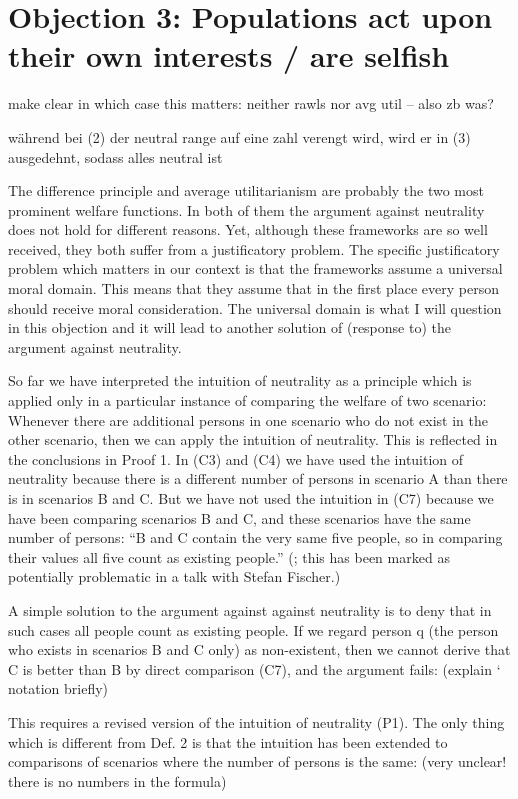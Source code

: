 \section{Objection 3: Populations act upon their own interests / are selfish}

make clear in which case this matters: neither rawls nor avg util – also zb was? 

während bei (2) der neutral range auf eine zahl verengt wird, wird er in (3) ausgedehnt, sodass alles neutral ist 

The difference principle and average utilitarianism are probably the two most prominent welfare functions. In both of them the argument against neutrality does not hold for different reasons. Yet, although these frameworks are so well received, they both suffer from a justificatory problem. The specific justificatory problem which matters in our context is that the frameworks assume a universal moral domain. This means that they assume that in the first place every person should receive moral consideration. The universal domain is what I will question in this objection and it will lead to another solution of (response to) the argument against neutrality.  

So far we have interpreted the intuition of neutrality as a principle which is applied only in a particular instance of comparing the welfare of two scenario: Whenever there are additional persons in one scenario who do not exist in the other scenario, then we can apply the intuition of neutrality. This is reflected in the conclusions in Proof 1. In (C3) and (C4) we have used the intuition of neutrality because there is a different number of persons in scenario A than there is in scenarios B and C. But we have not used the intuition in (C7) because we have been comparing scenarios B and C, and these scenarios have the same number of persons: “B and C contain the very same five people, so in comparing their values all five count as existing people.” (; this has been marked as potentially problematic in a talk with Stefan Fischer.) 

A simple solution to the argument against against neutrality is to deny that in such cases all people count as existing people. If we regard person q (the person who exists in scenarios B and C only) as non-existent, then we cannot derive that C is better than B by direct comparison (C7), and the argument fails: (explain ‘ notation briefly) 
\begin{comment}
\ \ (C7’)\ \ (A1) ${\wedge}$ (A2) ${\wedge}$ (A3) \ $\Rightarrow $ \ uB(P0) {\textgreater} uC(P0) 

\ \ (C8’)\ \ (C7’) ${\wedge}$ (P1) \ $\Rightarrow $ \ uB(P0 ${\cup}$ P+) {\textgreater} uC(P0 ${\cup}$ P+) 

\ \ (C9’)\ \ (C4) \ $\Leftrightarrow $ \ (C8) 
\end{comment}
This requires a revised version of the intuition of neutrality (P1). The only thing which is different from Def. 2 is that the intuition has been extended to comparisons of scenarios where the number of persons is the same: (very unclear! there is no numbers in the formula) 

